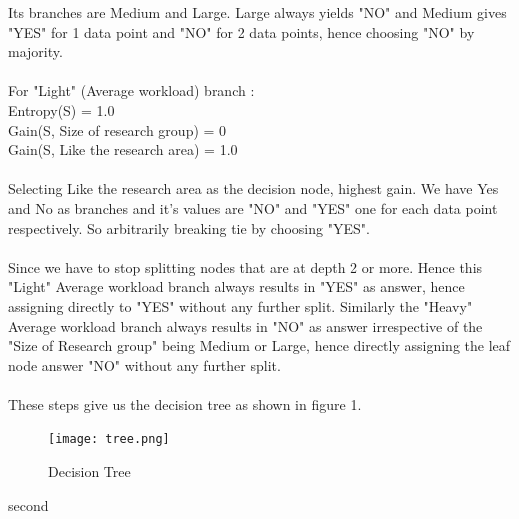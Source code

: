 \documentclass[a4paper,11pt]{article}
\begin{document}
\begin{mlsolution}
Its branches are Medium and Large. Large always yields "NO" and Medium gives "YES" for 1 data point and "NO" for 2 data points, hence choosing "NO" by majority.\\\\For "Light" (Average workload) branch :\\
Entropy(S) = 1.0\\
Gain(S, Size of research group) = 0\\
Gain(S, Like the research area) = 1.0\\\\Selecting Like the research area as the decision node, highest gain. We have Yes and No as branches and it's values are "NO" and "YES" one for each data point respectively. So arbitrarily breaking tie by choosing "YES".\\\\Since we have to stop splitting nodes that are at depth 2 or more. Hence this "Light" Average workload branch always results in "YES" as answer, hence assigning directly to "YES" without any further split. Similarly the "Heavy" Average workload branch always results in "NO" as answer irrespective of the "Size of Research group" being Medium or Large, hence directly assigning the leaf node answer "NO" without any further split.\\\\These steps give us the decision tree as shown in figure 1.

\begin{figure}[th]%
\centering
\texttt{[image: tree.png]}%

\caption{Decision Tree}%
\label{fig:Dtree}%
\end{figure}



\end{mlsolution}

\begin{mlsolution}
second
\end{mlsolution}
\end{document}
